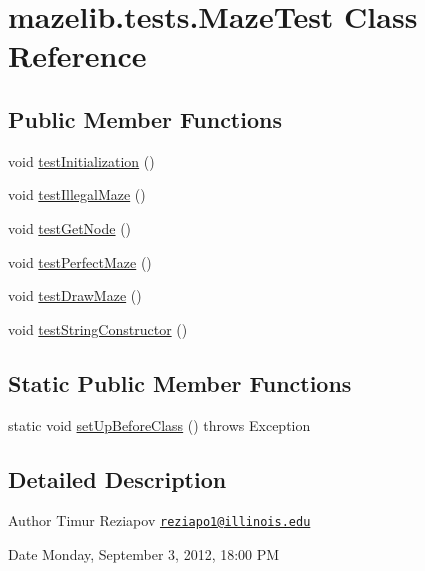 \hypertarget{classmazelib_1_1tests_1_1_maze_test}{\section{mazelib.\-tests.\-Maze\-Test Class Reference}
\label{classmazelib_1_1tests_1_1_maze_test}
}
\subsection*{Public Member Functions}
\begin{DoxyCompactItemize}
\item 
void \hyperlink{classmazelib_1_1tests_1_1_maze_test_ab0b2a3fb6a31b1e842ec2426f6ec25ba}{test\-Initialization} ()
\item 
void \hyperlink{classmazelib_1_1tests_1_1_maze_test_ab8f188842ecb12b90a27d06e642d6d5e}{test\-Illegal\-Maze} ()
\item 
void \hyperlink{classmazelib_1_1tests_1_1_maze_test_a27e62c8b2f0353746a4e2a1b13e1d4d2}{test\-Get\-Node} ()
\item 
void \hyperlink{classmazelib_1_1tests_1_1_maze_test_a9a8950ef982e1dea795f7fd772b6d606}{test\-Perfect\-Maze} ()
\item 
void \hyperlink{classmazelib_1_1tests_1_1_maze_test_ab716c61475125c279f10adc0098fc33f}{test\-Draw\-Maze} ()
\item 
void \hyperlink{classmazelib_1_1tests_1_1_maze_test_a662f324e8321096a6087f8d44a9479d0}{test\-String\-Constructor} ()
\end{DoxyCompactItemize}
\subsection*{Static Public Member Functions}
\begin{DoxyCompactItemize}
\item 
static void \hyperlink{classmazelib_1_1tests_1_1_maze_test_aa190b5be34fedf99a6d49df89e797d67}{set\-Up\-Before\-Class} ()  throws Exception  	
\end{DoxyCompactItemize}


\subsection{Detailed Description}
\begin{DoxyAuthor}{Author}
Timur Reziapov \href{mailto:reziapo1@illinois.edu}{\tt reziapo1@illinois.\-edu} 
\end{DoxyAuthor}
\begin{DoxyDate}{Date}
Monday, September 3, 2012, 18\-:00 P\-M 
\end{DoxyDate}


